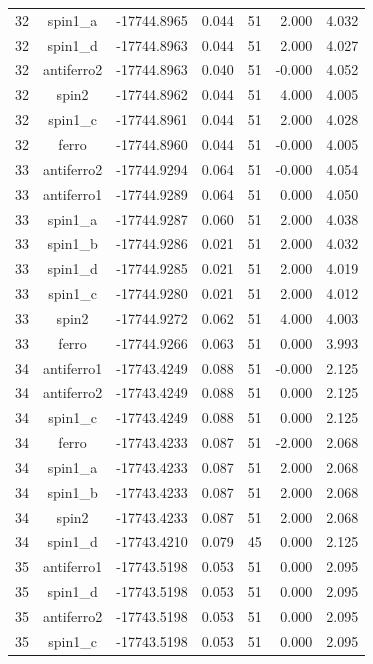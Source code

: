\begin{longtable}{@{}ccrrrrr@{}}
32 & spin1\_a & -17744.8965 & 0.044 & 51 & 2.000 & 4.032 \\
32 & spin1\_d & -17744.8963 & 0.044 & 51 & 2.000 & 4.027 \\
32 & antiferro2 & -17744.8963 & 0.040 & 51 & -0.000 & 4.052 \\
32 & spin2 & -17744.8962 & 0.044 & 51 & 4.000 & 4.005 \\
32 & spin1\_c & -17744.8961 & 0.044 & 51 & 2.000 & 4.028 \\
32 & ferro & -17744.8960 & 0.044 & 51 & -0.000 & 4.005 \\
\rowcolor{gray!20} 33 & antiferro2 & -17744.9294 & 0.064 & 51 & -0.000 & 4.054 \\
33 & antiferro1 & -17744.9289 & 0.064 & 51 & 0.000 & 4.050 \\
33 & spin1\_a & -17744.9287 & 0.060 & 51 & 2.000 & 4.038 \\
33 & spin1\_b & -17744.9286 & 0.021 & 51 & 2.000 & 4.032 \\
33 & spin1\_d & -17744.9285 & 0.021 & 51 & 2.000 & 4.019 \\
33 & spin1\_c & -17744.9280 & 0.021 & 51 & 2.000 & 4.012 \\
33 & spin2 & -17744.9272 & 0.062 & 51 & 4.000 & 4.003 \\
33 & ferro & -17744.9266 & 0.063 & 51 & 0.000 & 3.993 \\
\rowcolor{gray!20} 34 & antiferro1 & -17743.4249 & 0.088 & 51 & -0.000 & 2.125 \\
34 & antiferro2 & -17743.4249 & 0.088 & 51 & 0.000 & 2.125 \\
34 & spin1\_c & -17743.4249 & 0.088 & 51 & 0.000 & 2.125 \\
34 & ferro & -17743.4233 & 0.087 & 51 & -2.000 & 2.068 \\
34 & spin1\_a & -17743.4233 & 0.087 & 51 & 2.000 & 2.068 \\
34 & spin1\_b & -17743.4233 & 0.087 & 51 & 2.000 & 2.068 \\
34 & spin2 & -17743.4233 & 0.087 & 51 & 2.000 & 2.068 \\
34 & spin1\_d & -17743.4210 & 0.079 & 45 & 0.000 & 2.125 \\
\rowcolor{gray!20} 35 & antiferro1 & -17743.5198 & 0.053 & 51 & 0.000 & 2.095 \\
35 & spin1\_d & -17743.5198 & 0.053 & 51 & 0.000 & 2.095 \\
35 & antiferro2 & -17743.5198 & 0.053 & 51 & 0.000 & 2.095 \\
35 & spin1\_c & -17743.5198 & 0.053 & 51 & 0.000 & 2.095 \\

\end{longtable}
